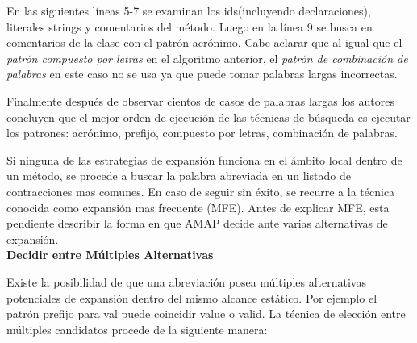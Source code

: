 \documentclass[a4paper,12pt]{report}
\begin{document}
En las siguientes líneas 5-7 se examinan los ids(incluyendo declaraciones), literales strings y comentarios del método. Luego en la línea 9 se busca en comentarios de la clase con el patrón acrónimo. Cabe aclarar que al igual que el \textit{patrón compuesto por letras} en el algoritmo anterior, el \textit{patrón de combinación de palabras} en este caso no se usa ya que puede tomar palabras largas incorrectas.

Finalmente después de observar cientos de casos de palabras largas los autores concluyen que el mejor orden de ejecución de las técnicas de búsqueda es ejecutar los patrones: acrónimo, prefijo, compuesto por letras, combinación de palabras.

Si ninguna de las estrategias de expansión funciona en el ámbito local dentro de un método, se procede a buscar la palabra abreviada en un listado de contracciones mas comunes. En caso de seguir sin éxito, se recurre a la técnica conocida como expansión mas frecuente (MFE). Antes de explicar MFE, esta pendiente describir la forma en que AMAP decide ante varias alternativas de expansión.\\

\noindent \textbf{Decidir entre Múltiples Alternativas\\}

Existe la posibilidad de que una abreviación posea múltiples alternativas potenciales de expansión dentro del mismo alcance estático. Por ejemplo el patrón prefijo para \textsf{val} puede coincidir \textsf{value} o \textsf{valid}. La técnica de elección entre múltiples candidatos procede de la siguiente manera:
\end{document}
